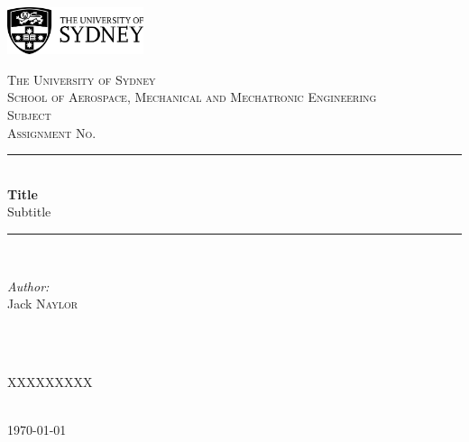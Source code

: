 \documentclass[11pt]{article}
\title{}
\begin{document}
\begin{titlepage}

\newcommand{\HRule}{\rule{\linewidth}{0.5mm}} 
\begin{flushright}
\includegraphics[width=0.3\textwidth]{images/usydNew.png}\\[2cm]
\end{flushright}

\center 


\textsc{\LARGE The University of Sydney}\\[0.75cm]
\textsc{\Large School of Aerospace, Mechanical and Mechatronic Engineering}\\[1cm]

\textsc{\Large Subject}\\[0.25cm] 
\textsc{\large Assignment No.}\\[1cm] 


\HRule \\[0.4cm]
{ \huge \bfseries Title}\\[0.4cm] 
{\Large Subtitle}\\[0.4cm]
\HRule \\[1.25cm]
 

\begin{minipage}{0.4\textwidth}
\begin{flushleft} \large
\emph{Author:}\\
Jack \textsc{Naylor}\\
\end{flushleft}
\end{minipage}
~
\begin{minipage}{0.4\textwidth}
\begin{flushright} \large\emph{}\\
\textsc{XXXXXXXXX}\\
\end{flushright}
\end{minipage}\\[1.5cm]


{\large \today}\\[1.5cm]



\vfill

\end{titlepage}
\newpage
{}
\cfoot{}
\rhead{}
\thispagestyle{fancy}
\pagestyle{fancy}
\setcounter{page}{1}
\end{document}
